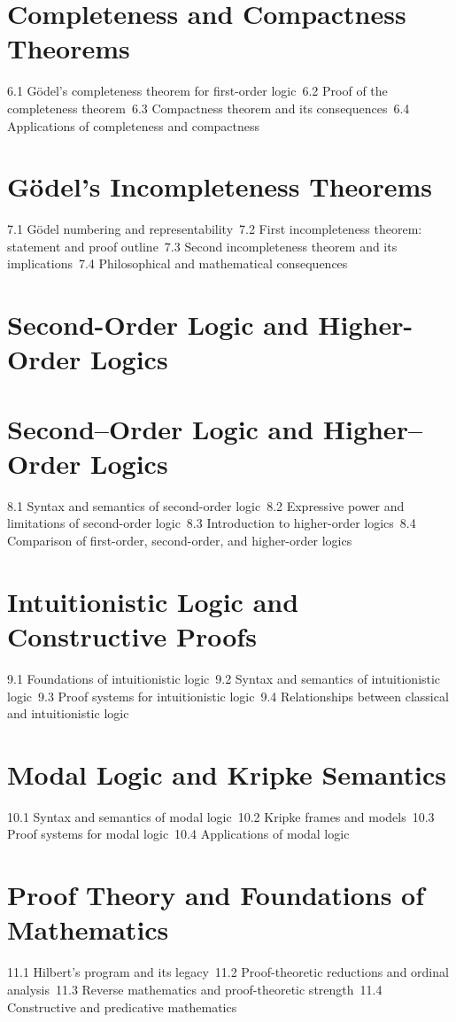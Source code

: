 \section{Completeness and Compactness Theorems}
6.1 Gödel's completeness theorem for first-order logic\
6.2 Proof of the completeness theorem\
6.3 Compactness theorem and its consequences\
6.4 Applications of completeness and compactness\
\section{Gödel's Incompleteness Theorems}
7.1 Gödel numbering and representability\
7.2 First incompleteness theorem: statement and proof outline\
7.3 Second incompleteness theorem and its implications\
7.4 Philosophical and mathematical consequences\
\section{Second-Order Logic and Higher-Order Logics}
\section{Second–Order Logic and Higher–Order Logics}
8.1 Syntax and semantics of second-order logic\
8.2 Expressive power and limitations of second-order logic\
8.3 Introduction to higher-order logics\
8.4 Comparison of first-order, second-order, and higher-order logics\
\section{Intuitionistic Logic and Constructive Proofs}
9.1 Foundations of intuitionistic logic\
9.2 Syntax and semantics of intuitionistic logic\
9.3 Proof systems for intuitionistic logic\
9.4 Relationships between classical and intuitionistic logic\
\section{Modal Logic and Kripke Semantics}
10.1 Syntax and semantics of modal logic\
10.2 Kripke frames and models\
10.3 Proof systems for modal logic\
10.4 Applications of modal logic\
\section{Proof Theory and Foundations of Mathematics}
11.1 Hilbert's program and its legacy\
11.2 Proof-theoretic reductions and ordinal analysis\
11.3 Reverse mathematics and proof-theoretic strength\
11.4 Constructive and predicative mathematics\
